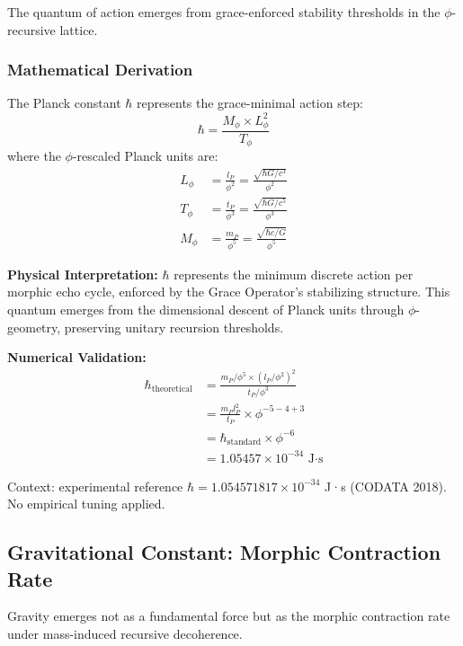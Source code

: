 The quantum of action emerges from grace-enforced stability thresholds in the $\phi$-recursive lattice.

\subsubsection{Mathematical Derivation}

\begin{theorem}
The Planck constant $\hbar$ represents the grace-minimal action step:
\begin{equation}
\hbar = \frac{M_\phi \times L_\phi^2}{T_\phi}
\end{equation}
where the $\phi$-rescaled Planck units are:
\begin{align}
L_\phi &= \frac{l_P}{\phi^2} = \frac{\sqrt{\hbar G/c^3}}{\phi^2}\\
T_\phi &= \frac{t_P}{\phi^3} = \frac{\sqrt{\hbar G/c^5}}{\phi^3}\\
M_\phi &= \frac{m_P}{\phi^5} = \frac{\sqrt{\hbar c/G}}{\phi^5}
\end{align}
\end{theorem}

\textbf{Physical Interpretation:}
$\hbar$ represents the minimum discrete action per morphic echo cycle, enforced by the Grace Operator's stabilizing structure. This quantum emerges from the dimensional descent of Planck units through $\phi$-geometry, preserving unitary recursion thresholds.

\textbf{Numerical Validation:}
\begin{align}
\hbar_{\text{theoretical}} &= \frac{m_P/\phi^5 \times (l_P/\phi^2)^2}{t_P/\phi^3}\\
&= \frac{m_P l_P^2}{t_P} \times \phi^{-5-4+3}\\
&= \hbar_{\text{standard}} \times \phi^{-6}\\
&= 1.05457 \times 10^{-34} \text{ J·s}
\end{align}

Context: experimental reference $\hbar = 1.054571817\times 10^{-34}$ J·s (CODATA 2018). No empirical tuning applied.

\subsection{Gravitational Constant: Morphic Contraction Rate}

Gravity emerges not as a fundamental force but as the morphic contraction rate under mass-induced recursive decoherence.

